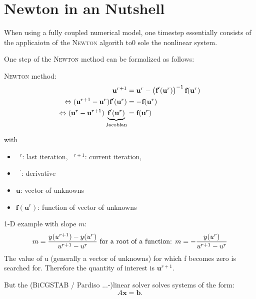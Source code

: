 

\chapter{Newton in an Nutshell}

When using a fully coupled numerical model, one timestep essentially consists of the applicaiotn of the \textsc{Newton} algorith to0 sole the nonlinear system.

One step of the \textsc{Newton} method can be formalized as follows:



\textsc{Newton} method: 
\begin{subequations}
\begin{align}
\label{NewtonGen}
\textbf{u}^{r+1} &= \textbf{u}^r -  \left(\textbf{f}^\prime (\textbf{u}^r) \right)^{-1} \textbf{f}(\textbf{u}^r) \\
\Leftrightarrow ( \textbf{u}^{r+1}-\textbf{u}^r) {\textbf{f}^{\prime}(\textbf{u}^r)} &= -\textbf{f}(\textbf{u}^r) \\
\Leftrightarrow ( \textbf{u}^r - \textbf{u}^{r+1}) \underbrace{\textbf{f}^{\prime}(\textbf{u}^r)}_{\textnormal{Jacobian}} &= \textbf{f}(\textbf{u}^r) \label{NewtonAsUsed}
\end{align}
\end{subequations}

\noindent with
\begin{itemize}
\item $\phantom{a}^r$: last iteration, $\phantom{a}^{r+1}$: current iteration,
\item $\phantom{a}^\prime$: derivative
\item $\textbf{u}$: vector of unknowns
\item $\textbf{f}(\textbf{u}^r)$: function of vector of unknowns
\end{itemize}

1-D example with slope $m$:
\begin{equation}
 m= \frac{y(u^{r+1})-y(u^{r})}{u^{r+1}-u^{r}} \textnormal{ for a root of a function: } m= - \frac{y(u^{r})}{u^{r+1}-u^{r}}
\end{equation}
The value of u (generally a vector of unknowns) for which f becomes zero is searched for. Therefore the quantity of interest is $\textbf{u}^{r+1}$.

But the (BiCGSTAB / Pardiso ...-)linear solver solves systems of the form:
\begin{equation}
\label{GenSysEq}
 A\textbf{x} = \textbf{b} .
\end{equation}

